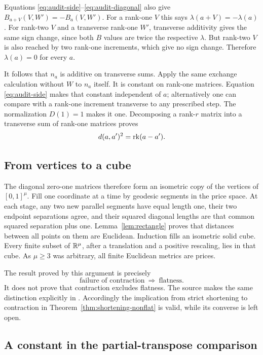 Equations \eqref{eq:audit-side}--\eqref{eq:audit-diagonal}
also give
$B_{a+V}(V,W')=-B_a(V,W')$.
For a rank-one $V$ this says
$\lambda(a+V)=-\lambda(a)$.
For rank-two $V$ and a transverse rank-one $W'$, transverse
additivity gives the same sign change, since both $B$ values
are twice the respective $\lambda$.
But rank-two $V$ is also reached by two rank-one increments,
which give no sign change.
Therefore $\lambda(a)=0$ for every $a$.

It follows that $n_a$ is additive on transverse sums.
Apply the same exchange calculation without $W$ to $n_a$
itself. It is constant on rank-one matrices.
Equation \eqref{eq:audit-side} makes that constant independent
of $a$; alternatively one can compare with a rank-one
increment transverse to any prescribed step.
The normalization $D(1)=1$ makes it one.
Decomposing a rank-$r$ matrix into a transverse sum of
rank-one matrices proves
\[
 d(a,a')^2=\operatorname{rk}(a-a').
\]

\subsection{From vertices to a cube}

The diagonal zero-one matrices therefore form an isometric
copy of the vertices of $[0,1]^\mu$.
Fill one coordinate at a time by geodesic segments in the
price space.
At each stage, any two new parallel segments have equal
length one, their two endpoint separations agree, and their
squared diagonal lengths are that common squared separation
plus one.
Lemma~\ref{lem:rectangle} proves that distances between all
points on them are Euclidean.
Induction fills an isometric solid cube.
Every finite subset of $\mathbb R^\mu$, after a translation and a
positive rescaling, lies in that cube.
As $\mu\geq3$ was arbitrary, all finite Euclidean metrics are
prices.

The result proved by this argument is precisely
\[
 \text{failure of contraction}\ \Longrightarrow\ \text{flatness}.
\]
It does not prove that contraction excludes flatness.
The source makes the same distinction explicitly in
\cite[Section D.3, p.~31]{Anthropic2026}.
Accordingly the implication from strict shortening to
contraction in Theorem~\ref{thm:shortening-nonflat} is valid,
while its converse is left open.


\subsection{A constant in the partial-transpose comparison}


